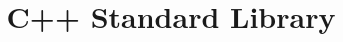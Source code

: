 \documentclass{beamer}
\title{C++ Standard Library}
\begin{document}
\begin{frame}
  
\end{frame}
\end{document}
